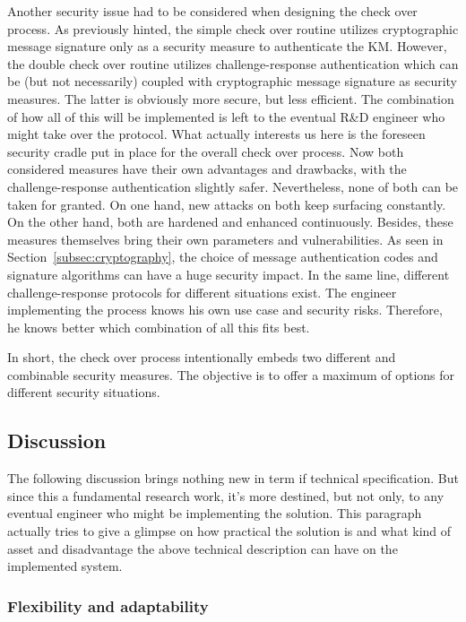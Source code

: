 Another security issue had to be considered when designing the check over process. As previously hinted, the simple check over routine utilizes cryptographic message signature only as a security measure to authenticate the KM. However, the double check over routine utilizes challenge-response authentication which can be (but not necessarily) coupled with cryptographic message signature as security measures. The latter is obviously more secure, but less efficient. The combination of how all of this will be implemented is left to the eventual R\&D engineer who might take over the protocol. What actually interests us here is the foreseen security cradle put in place for the overall check over process. Now both considered measures have their own advantages and drawbacks, with the challenge-response authentication slightly safer. Nevertheless, none of both can be taken for granted. On one hand, new attacks on both keep surfacing constantly. On the other hand, both are hardened and enhanced continuously. Besides, these measures themselves bring their own parameters and vulnerabilities. As seen in Section~\ref{subsec:cryptography}, the choice of message authentication codes and signature algorithms can have a huge security impact. In the same line, different challenge-response protocols for different situations exist. The engineer implementing the process knows his own use case and security risks. Therefore, he knows better which combination of all this fits best.

In short, the check over process intentionally embeds two different and combinable security measures. The objective is to offer a maximum of options for different security situations.

\subsection{Discussion}

The following discussion brings nothing new in term if technical specification. But since this a fundamental research work, it's more destined, but not only, to any eventual engineer who might be implementing the solution. This paragraph actually tries to give a glimpse on how practical the solution is and what kind of asset and disadvantage the above technical description can have on the implemented system.

\subsubsection{Flexibility and adaptability}

